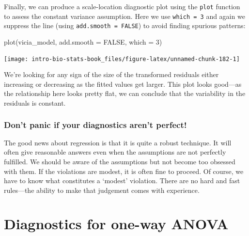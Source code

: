 \documentclass[
]{book}
\newenvironment{Shaded}{\begin{snugshade}}{\end{snugshade}}
\newcommand{\AttributeTok}[1]{\textcolor[rgb]{0.77,0.63,0.00}{#1}}
\newcommand{\ConstantTok}[1]{\textcolor[rgb]{0.00,0.00,0.00}{#1}}
\newcommand{\DecValTok}[1]{\textcolor[rgb]{0.00,0.00,0.81}{#1}}
\newcommand{\FunctionTok}[1]{\textcolor[rgb]{0.00,0.00,0.00}{#1}}
\newcommand{\NormalTok}[1]{#1}
\newenvironment{greybox}{
  \definecolor{shadecolor}{rgb}{0.95,0.95,0.95}  %
  \color{black}
  \begin{shaded}}
 {\end{shaded}}
\newenvironment{infobox}[1]
  {
  \begin{itemize}
  \renewcommand{\labelitemi}{
    \raisebox{-.7\height}[0pt][0pt]{
      {\setkeys{Gin}{width=3em,keepaspectratio}
        \texttt{[image: images/\#1]}}
    }
  }
  \setlength{\fboxsep}{1em}
  \begin{greybox}
  \item
  }
  {
  \end{greybox}
  \end{itemize}
  }
\begin{document}
Finally, we can produce a scale-location diagnostic plot using the \texttt{plot} function to assess the constant variance assumption. Here we use \texttt{which\ =\ 3} and again we suppress the line (using \texttt{add.smooth\ =\ FALSE}) to avoid finding spurious patterns:

\begin{Shaded}
\begin{Highlighting}[]
\FunctionTok{plot}\NormalTok{(vicia\_model, }\AttributeTok{add.smooth =} \ConstantTok{FALSE}\NormalTok{, }\AttributeTok{which =} \DecValTok{3}\NormalTok{)}
\end{Highlighting}
\end{Shaded}

\begin{center}\texttt{[image: intro-bio-stats-book\_files/figure-latex/unnamed-chunk-182-1]} \end{center}

We're looking for any sign of the size of the transformed residuals either increasing or decreasing as the fitted values get larger. This plot looks good---as the relationship here looks pretty flat, we can conclude that the variability in the residuals is constant.

\begin{infobox}{warning}

\hypertarget{dont-panic-if-your-diagnostics-arent-perfect}{%
\subsubsection*{Don't panic if your diagnostics aren't perfect!}\label{dont-panic-if-your-diagnostics-arent-perfect}}

The good news about regression is that it is quite a robust technique. It will often give reasonable answers even when the assumptions are not perfectly fulfilled. We should be aware of the assumptions but not become too obsessed with them. If the violations are modest, it is often fine to proceed. Of course, we have to know what constitutes a `modest' violation. There are no hard and fast rules---the ability to make that judgement comes with experience.

\end{infobox}

\hypertarget{diagnostics-for-one-way-anova}{%
\section{Diagnostics for one-way ANOVA}\label{diagnostics-for-one-way-anova}}
\end{document}
